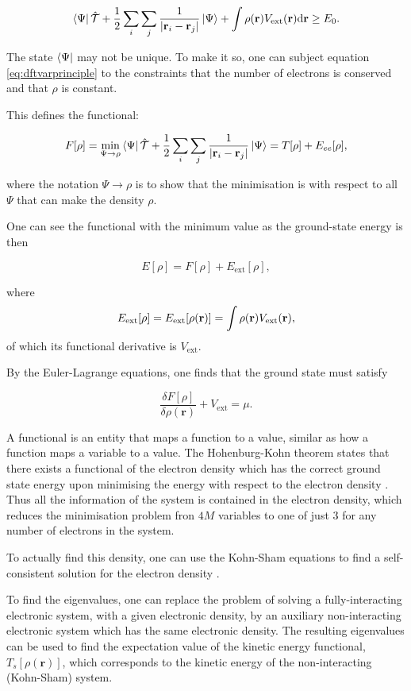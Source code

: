 \documentclass[a4paper,12pt,oneside,print,numbered,index,PageStyleIII]{PhDThesisPSnPDF}
\begin{document}
\begin{enumerate}
\[ \bra{\Psi} \mathcal{\hat{T}} + \frac{1}{2} \sum_i\sum_j \frac{1}{| \mathbf{r}_i -
 \mathbf{r}_j |}  \ket{\Psi} + \int \rho(\mathbf{r}) V_{\text{ext}}(\mathbf{r})
 \text{d}\mathbf{r} \geq E_0.
 \label{eq:dftvarprinciple} \]

The state \(\bra{\Psi}\) may not be unique. To make it so, one can subject equation \ref{eq:dftvarprinciple}
to the constraints that the number of electrons is conserved and that \(\rho\) is constant.

This defines the functional:

\[ F[\rho] = \underset{\Psi \rightarrow \rho}{\text{min}} \bra{\Psi} \mathcal{\hat{T}} +
 \frac{1}{2} \sum_i\sum_j \frac{1}{| \mathbf{r}_i - \mathbf{r}_j |}  \ket{\Psi} = T[\rho] +
 E_{ee}[\rho],   \]

where the notation \(\Psi \rightarrow \rho\) is to show that the minimisation is with respect to
all \(\Psi\) that can make the density \(\rho\).

One can see the functional with the minimum value as the ground-state energy is then

\[ E[\rho] = F[\rho] + E_{\text{ext}}[\rho], \]

where \[ E_{\text{ext}}[\rho] = E_{\text{ext}}[\rho(\mathbf{r})] =  \int \rho(\mathbf{r})
 V_{\text{\text{ext}}}(\mathbf{r}), \]
of which its functional derivative is \(V_{\text{ext}}\).

By the Euler-Lagrange equations, one finds that the ground state must satisfy

\[ \frac{\delta F[\rho]}{\delta \rho(\mathbf{r}) } + V_{\text{ext}}= \mu. \]

A functional is an entity that maps a function to a value, similar as how a function maps a
variable to a value. The Hohenburg-Kohn theorem states that there exists a functional of the
electron density which has the correct ground state energy upon minimising the energy with respect to
the electron density \cite{hohenburg64_inhomog_electron_gas}. Thus all the information of the
system is contained in the electron density, which reduces the minimisation
problem fron \(4M\) variables to one of just 3 for any number of electrons in the system.

To actually find this density, one can use the Kohn-Sham equations to find a self-consistent
solution for the electron density \cite{kohn65_self_cons_eq}.




To find the eigenvalues, one can replace the problem of solving a fully-interacting electronic
system, with a given electronic density, by an auxiliary non-interacting electronic system which has
the same electronic density. The resulting eigenvalues can be used to find the expectation value of
the kinetic energy functional, \(T_s[\rho(\mathbf{r})]\), which corresponds to the kinetic energy of the
non-interacting (Kohn-Sham) system.


\end{enumerate}
\end{document}
